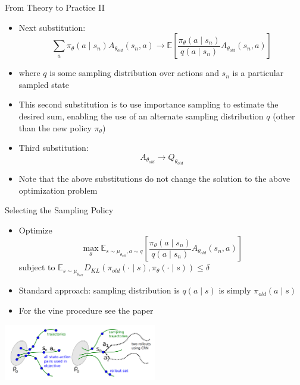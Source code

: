 \documentclass[aspectratio=169]{../latex_main/tntbeamer}  %
\begin{document}
\begin{frame}[c]{From Theory to Practice II}
	
    \begin{itemize}
        \item Next substitution:
        $$\sum_{a} \pi_\theta (a\mid s_n) A_{\theta_{old}} (s_n, a) \to \mathbb{E}\left[ \frac{\pi_\theta(a \mid s_n)}{q(a\mid s_n)} A_{\theta_{old}} (s_n, a) \right] $$
        \item where $q$ is some sampling distribution over actions and $s_n$ is a particular sampled state
        \item This second substitution is to use importance sampling to estimate the desired sum, enabling the use of an alternate sampling distribution $q$ (other than the new policy $\pi_\theta$)
        \pause
        \item Third substitution:
        $$ A_{\theta_{old}} \to Q_{\theta_{old}}$$
        \item Note that the above substitutions do not change the solution to the above optimization problem
    \end{itemize}

\end{frame}
\begin{frame}[c]{Selecting the Sampling Policy}
	
    \begin{itemize}
        \item Optimize
        $$ \max_\theta \mathbb{E}_{s\sim \mu_{\theta_{old}}, a \sim q} \left[ \frac{\pi_\theta(a \mid s_n)}{q(a\mid s_n)} A_{\theta_{old}} (s_n, a) \right]$$
        {\centering subject to $\mathbb{E}_{s\sim \mu_{\theta_{old}}} D_{KL}(\pi_{old}(\cdot \mid s), \pi_\theta (\cdot \mid s)) \leq \delta$ \\}
        \item Standard approach: sampling distribution is $q(a\mid s)$ is simply $\pi_{old}(a \mid s)$
        \item For the vine procedure see the paper
    \end{itemize}
    
    \centering
    \includegraphics[width=0.5\textwidth]{w07_policy_search/images/trpo.PNG}\\

\end{frame}
\end{document}
